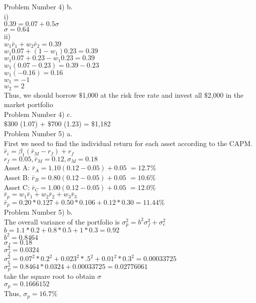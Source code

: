 \documentclass[11pt]{article}
\begin{document}
Problem Number 4) b.\\
i)\\
$0.39 = 0.07 + 0.5 \sigma$\\
$\sigma = 0.64$\\

ii)\\
$w_{1} \bar{r}_{1} + w_{2} \bar{r}_{2} = 0.39$\\
$w_{1} 0.07 + (1 - w_{1}) 0.23 = 0.39$\\
$w_{1} 0.07 + 0.23 - w_{1} 0.23 = 0.39$\\
$w_{1} (0.07 - 0.23) = 0.39 - 0.23$\\
$w_{1} (-0.16) = 0.16$\\
$w_{1} = -1$\\
$w_{2} = 2$\\
Thus, we should borrow $\$$1,000 at the risk free rate and invest all $\$$2,000 in the market portfolio\\

Problem Number 4) c.\\
$\$$300 (1.07) + $\$$700 (1.23) = $\$$1,182\\

Problem Number 5) a.\\
First we need to find the individual return for each asset according to the CAPM.\\
$\bar{r}_{i} = \beta_{1} (\bar{r}_{M} - r_{f}) + r_{f}$\\
$r_{f} = 0.05, \bar{r}_{M} = 0.12, \sigma_{M} = 0.18$\\
Asset A: $\bar{r}_{A} = 1.10 (0.12 - 0.05) + 0.05$ $ = 12.7 \%$\\
Asset B: $\bar{r}_{B} = 0.80 (0.12 - 0.05) + 0.05$ $ = 10.6 \%$\\
Asset C: $\bar{r}_{C} = 1.00 (0.12 - 0.05) + 0.05$ $ = 12.0 \%$\\

$\bar{r}_{p} = w_{1} \bar{r}_{1} + w_{2} \bar{r}_{2} + w_{3} \bar{r}_{3}$\\
$\bar{r}_{p} = 0.20 * 0.127 + 0.50 * 0.106 + 0.12 * 0.30 = 11.44\%$\\

Problem Number 5) b.\\
The overall variance of the portfolio is $\sigma_{p}^{2} = b^{2} \sigma_{f}^{2} + \sigma_{e}^{2}$\\
$b = 1.1*0.2 + 0.8*0.5 + 1*0.3 = 0.92$\\
$b^{2} = 0.8464$\\
$\sigma_{f} = 0.18$\\
$\sigma_{f}^{2} = 0.0324$\\
$\sigma_{e}^{2} = 0.07^{2}*0.2^{2} + 0.023^{2}*.5^{2} + 0.01^{2}*0.3^{2} = 0.00033725$\\
$\sigma_{p}^{2} = 0.8464*0.0324 + 0.00033725 = 0.02776061$\\
take the square root to obtain $\sigma$\\
$\sigma_{p} = 0.1666152$\\
Thus, $\sigma_{p} = 16.7 \%$\\
\end{document}
